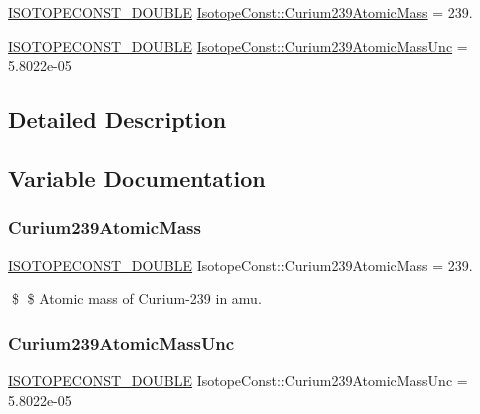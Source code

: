 \begin{DoxyCompactItemize}
\item 
\mbox{\hyperlink{group___isotope_const-_macros_ga8f45a7272ce02c0b4c65c44636ed719a}{I\+S\+O\+T\+O\+P\+E\+C\+O\+N\+S\+T\+\_\+\+D\+O\+U\+B\+LE}} \mbox{\hyperlink{group___isotope_const-_curium-_cm239_ga5516da35082486a6c3bc344f4f68d408}{Isotope\+Const\+::\+Curium239\+Atomic\+Mass}} = 239.
\item 
\mbox{\hyperlink{group___isotope_const-_macros_ga8f45a7272ce02c0b4c65c44636ed719a}{I\+S\+O\+T\+O\+P\+E\+C\+O\+N\+S\+T\+\_\+\+D\+O\+U\+B\+LE}} \mbox{\hyperlink{group___isotope_const-_curium-_cm239_gaa934a5a42a89f0c440f770297d8c345f}{Isotope\+Const\+::\+Curium239\+Atomic\+Mass\+Unc}} = 5.\+8022e-\/05
\end{DoxyCompactItemize}


\subsection{Detailed Description}


\subsection{Variable Documentation}
\mbox{\label{group___isotope_const-_curium-_cm239_ga5516da35082486a6c3bc344f4f68d408}} 
\subsubsection{\texorpdfstring{Curium239\+Atomic\+Mass}{Curium239AtomicMass}}
{\footnotesize\ttfamily \mbox{\hyperlink{group___isotope_const-_macros_ga8f45a7272ce02c0b4c65c44636ed719a}{I\+S\+O\+T\+O\+P\+E\+C\+O\+N\+S\+T\+\_\+\+D\+O\+U\+B\+LE}} Isotope\+Const\+::\+Curium239\+Atomic\+Mass = 239.}

\$ \$ Atomic mass of Curium-\/239 in amu. \mbox{\label{group___isotope_const-_curium-_cm239_gaa934a5a42a89f0c440f770297d8c345f}} 
\subsubsection{\texorpdfstring{Curium239\+Atomic\+Mass\+Unc}{Curium239AtomicMassUnc}}
{\footnotesize\ttfamily \mbox{\hyperlink{group___isotope_const-_macros_ga8f45a7272ce02c0b4c65c44636ed719a}{I\+S\+O\+T\+O\+P\+E\+C\+O\+N\+S\+T\+\_\+\+D\+O\+U\+B\+LE}} Isotope\+Const\+::\+Curium239\+Atomic\+Mass\+Unc = 5.\+8022e-\/05}

